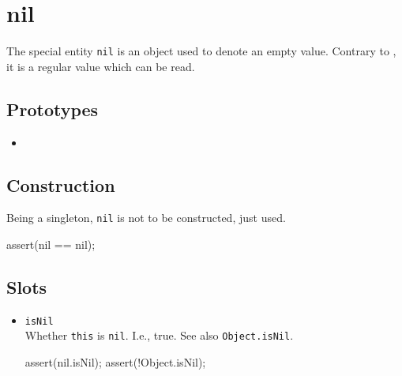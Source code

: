 \section{nil}

The special entity \lstinline|nil| is an object used to denote an
empty value.  Contrary to , it is a regular value
which can be read.

\subsection{Prototypes}

\begin{itemize}
\item {}
\end{itemize}

\subsection{Construction}

Being a singleton, \lstinline|nil| is not to be constructed, just used.

\begin{urbiscript}
assert(nil == nil);
\end{urbiscript}

\subsection{Slots}

\begin{itemize}
\item \lstinline|isNil|\\
  Whether \lstinline|this| is \lstinline|nil|.  I.e., true.  See also
  \lstinline|Object.isNil|.
\begin{urbiscript}[firstnumber=last]
assert(nil.isNil);
assert(!Object.isNil);
\end{urbiscript}

\end{itemize}




